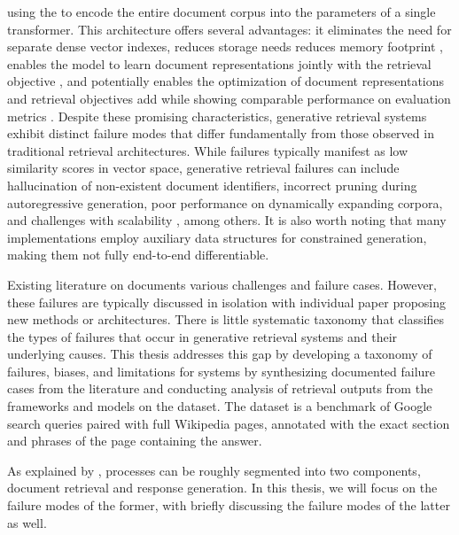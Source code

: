 using the  to encode the entire document corpus into the parameters of a single transformer.
This architecture offers several advantages: it eliminates the need for separate dense vector indexes, reduces storage needs \cite{michele-bevilacqua-autoregressive-search}
reduces memory footprint \cite{hansi-zeng-planning-ahead}, enables the model to learn document representations jointly with the retrieval objective \cite{weiwei-sun-learning-to,yubao-tang-listwise-generative} %
, and potentially enables the optimization of document representations and retrieval objectives %
add while showing comparable performance on evaluation metrics
\cite{michele-bevilacqua-autoregressive-search,hansi-zeng-planning-ahead,yubao-tang-listwise-generative}.
Despite these promising characteristics, generative retrieval systems exhibit distinct failure modes that differ fundamentally from those observed in traditional retrieval architectures. While  failures typically manifest as low similarity scores in vector space, generative retrieval failures can include hallucination of non-existent document identifiers, incorrect pruning during autoregressive generation, poor performance on dynamically expanding corpora, and challenges with scalability \cite{metzler-rethinking-search,ji-survey-of,hansi-zeng-planning-ahead,ronak-pradeep-how-does}, among others.
It is also worth noting that many  implementations employ auxiliary data structures for constrained generation, making them not fully end-to-end differentiable.

Existing literature on  documents various challenges and failure cases. However, these failures are typically discussed in isolation with individual paper proposing new methods or architectures. There is little systematic taxonomy that classifies the types of failures that occur in generative retrieval systems and their underlying causes.
This thesis addresses this gap by developing a taxonomy of failures, biases, and limitations for  systems by synthesizing documented failure cases from the literature and conducting analysis of retrieval outputs from the frameworks  \cite{michele-bevilacqua-autoregressive-search} and  models \cite{yongqi-li-multiview-identifiers} on the  dataset. The  dataset \cite{kwiatkowski-natural-questions} is a benchmark of Google search queries paired with full Wikipedia pages, annotated with the exact section and phrases of the page containing the answer.

As explained by \citet{xiaoxi-li-from-matching},  processes can be roughly segmented into two components, document retrieval and response generation. In this thesis, we will focus on the failure modes of the former, with briefly discussing the failure modes of the latter as well.

